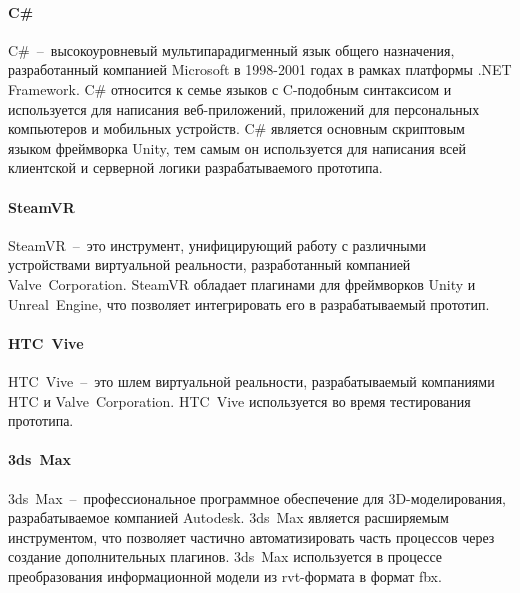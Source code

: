 \paragraph{C\#}
C\#~--~высокоуровневый мультипарадигменный язык общего назначения,
разработанный компанией Microsoft в 1998-2001 годах
в рамках платформы .NET Framework.
C\# относится к семье языков с C-подобным синтаксисом и
используется для написания веб-приложений,
приложений для персональных компьютеров и мобильных устройств.
\cite{DocCSharp}
C\# является основным скриптовым языком фреймворка Unity,
тем самым он используется для написания всей
клиентской и серверной логики разрабатываемого прототипа.

\paragraph{SteamVR}
SteamVR~--~это инструмент, унифицирующий работу с различными
устройствами виртуальной реальности,
разработанный компанией Valve~Corporation.%
\cite{SteamVR}
SteamVR обладает плагинами для фреймворков Unity и Unreal~Engine,
что позволяет интегрировать его в разрабатываемый прототип. 

\paragraph{HTC~Vive}

HTC~Vive~--~это шлем виртуальной реальности,
разрабатываемый компаниями HTC и Valve~Corporation.%
\cite{HTCVive}
HTC~Vive используется во время тестирования прототипа.

\paragraph{3ds~Max}

3ds~Max~--~профессиональное программное обеспечение для 3D-моделирования,
разрабатываемое компанией Autodesk.
3ds~Max является расширяемым инструментом,
что позволяет частично автоматизировать часть процессов
через создание дополнительных плагинов.%
\cite{Doc3DSMAX}
3ds~Max используется в процессе преобразования информационной модели
из rvt-формата в формат fbx.

